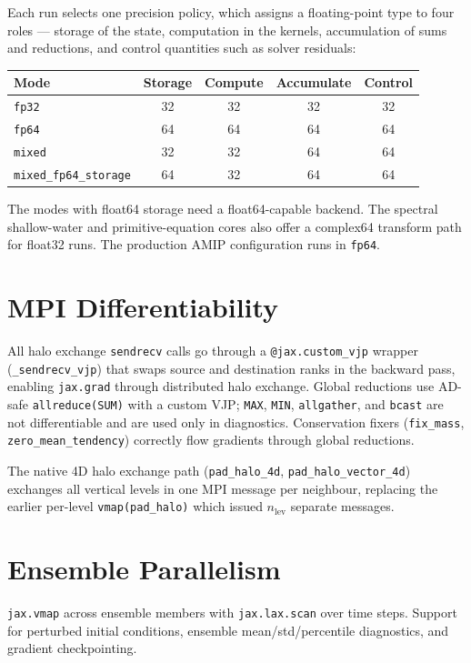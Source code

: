 \documentclass[11pt,twoside]{report}
\begin{document}
Each run selects one precision policy, which assigns a floating-point type to
four roles --- storage of the state, computation in the kernels, accumulation
of sums and reductions, and control quantities such as solver residuals:
\begin{center}
\begin{tabular}{lcccc}
\toprule
Mode & Storage & Compute & Accumulate & Control \\
\midrule
\texttt{fp32} & 32 & 32 & 32 & 32 \\
\texttt{fp64} & 64 & 64 & 64 & 64 \\
\texttt{mixed} & 32 & 32 & 64 & 64 \\
\texttt{mixed\_fp64\_storage} & 64 & 32 & 64 & 64 \\
\bottomrule
\end{tabular}
\end{center}
The modes with float64 storage need a float64-capable backend.  The spectral
shallow-water and primitive-equation cores also offer a complex64 transform
path for float32 runs.  The production AMIP configuration runs in
\texttt{fp64}.

\section{MPI Differentiability}

All halo exchange \texttt{sendrecv} calls go through a
\texttt{@jax.custom\_vjp} wrapper (\texttt{\_sendrecv\_vjp}) that swaps
source and destination ranks in the backward pass, enabling
\texttt{jax.grad} through distributed halo exchange.  Global reductions
use AD-safe \texttt{allreduce(SUM)} with a custom VJP; \texttt{MAX},
\texttt{MIN}, \texttt{allgather}, and \texttt{bcast} are not
differentiable and are used only in diagnostics.  Conservation fixers
(\texttt{fix\_mass}, \texttt{zero\_mean\_tendency}) correctly flow
gradients through global reductions.

The native 4D halo exchange path (\texttt{pad\_halo\_4d},
\texttt{pad\_halo\_vector\_4d}) exchanges all vertical levels in one
MPI message per neighbour, replacing the earlier per-level
\texttt{vmap(pad\_halo)} which issued $n_{\mathrm{lev}}$ separate
messages.

\section{Ensemble Parallelism}

\texttt{jax.vmap} across ensemble members with \texttt{jax.lax.scan}
over time steps.  Support for perturbed initial conditions, ensemble
mean/std/percentile diagnostics, and gradient checkpointing.
\end{document}
